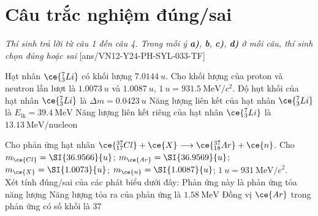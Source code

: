 \section{Câu trắc nghiệm đúng/sai}
\textit{Thí sinh trả lời từ câu 1 đến câu 4. Trong mỗi ý \textbf{a)}, \textbf{b}, \textbf{c)}, \textbf{d)} ở mỗi câu, thí sinh chọn đúng hoặc sai}
\setcounter{ex}{0}
[ans/VN12-Y24-PH-SYL-033-TF]
\begin{ex}
Hạt nhân $\ce{^7_3Li}$ có khối lượng $\SI{7.0144}{u}$. Cho khối lượng của proton và neutron lần lượt là $\SI{1.0073}{u}$ và $\SI{1.0087}{u}$, $\SI{1}{u}=\SI{931.5}{\mega\electronvolt/c^2}$.
	{\True Độ hụt khối của hạt nhân $\ce{^7_3Li}$ là $\Delta m=\SI{0.0423}{u}$}
	{\True Năng lượng liên kết của hạt nhân $\ce{^7_3Li}$ là $E_{\text{lk}}=\SI{39.4}{\mega\electronvolt}$}
	{Năng lượng liên kết riêng của hạt nhân $\ce{^7_3Li}$ là $\SI{13.13}{\mega\electronvolt/\text{nucleon}}$}
	\loigiai{}
\end{ex}
\begin{ex}
	Cho phản ứng hạt nhân $\ce{^{37}_{17}Cl}+\ce{X}\longrightarrow\ce{^{37}_{18}Ar}+\ce{n}$. Cho $m_{\ce{Cl}}=\SI{36.9566}{u}$; $m_{\ce{Ar}}=\SI{36.9569}{u}$; $m_{\ce{X}}=\SI{1.0073}{u}$; $m_{\ce{n}}=\SI{1.0087}{u}$; $\SI{1}{u}=\SI{931}{\mega\electronvolt/c^2}$.\\
	Xét tính đúng/sai của các phát biểu dưới đây: 
	{Phản ứng này là phản ứng tỏa năng lượng}
	{Năng lượng tỏa ra của phản ứng là $\SI{1.58}{\mega\electronvolt}$}
	{\True Đồng vị $\ce{Ar}$ trong phản ứng có số khối là 37}
	\loigiai{}
\end{ex}

